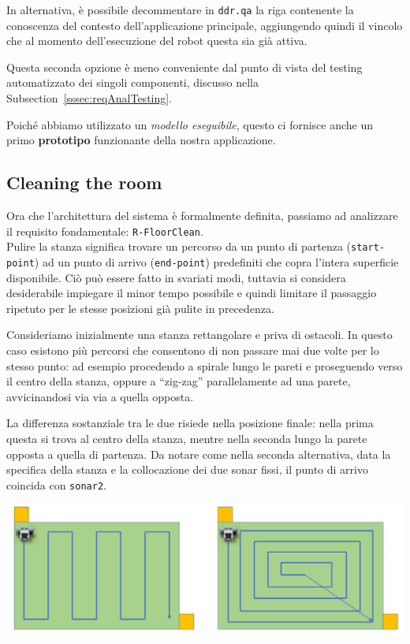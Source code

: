 \documentclass{../llncs}
\newcommand{\codescript}[1]{{\mbox{\small{\texttt{#1}}}}\xspace}
\newcommand{\code}[1]{{\color{blue}\small{\texttt{#1}}}}
\newcommand{\xsss}[1]{\subsectionname~\ref{sssec:#1}}
\newcommand{\subsectionname}{Subsection}
\begin{document}


In alternativa, è possibile decommentare in \codescript{ddr.qa} la riga contenente la conoscenza del contesto dell'applicazione principale, aggiungendo quindi il vincolo che al momento dell'esecuzione del robot questa sia già attiva.

Questa seconda opzione è meno conveniente dal punto di vista del testing automatizzato dei singoli componenti, discusso nella \xsss{reqAnalTesting}.\\

\vspace{8px}

Poiché abbiamo utilizzato un \emph{modello eseguibile}, questo ci fornisce anche un primo \textbf{prototipo} funzionante della nostra applicazione.

\subsection{Cleaning the room}
Ora che l'architettura del sistema è formalmente definita, passiamo ad analizzare il requisito fondamentale: \code{R-FloorClean}.\\

Pulire la stanza significa trovare un percorso da un punto di partenza (\code{start-point}) ad un punto di arrivo (\code{end-point}) predefiniti che copra l'intera superficie disponibile. Ciò può essere fatto in svariati modi, tuttavia si considera desiderabile impiegare il minor tempo possibile e quindi limitare il passaggio ripetuto per le stesse posizioni già pulite in precedenza.

Consideriamo inizialmente una stanza rettangolare e priva di ostacoli. In questo caso esistono più percorsi che consentono di non passare mai due volte per lo stesso punto: ad esempio procedendo a spirale lungo le pareti e proseguendo verso il centro della stanza, oppure a ``zig-zag'' parallelamente ad una parete, avvicinandosi via via a quella opposta.

La differenza sostanziale tra le due risiede nella posizione finale: nella prima questa si trova al centro della stanza, mentre nella seconda lungo la parete opposta a quella di partenza. Da notare come nella seconda alternativa, data la specifica della stanza e la collocazione dei due sonar fissi, il punto di arrivo coincida con \code{sonar2}.\\

\begin{center}
\includegraphics[scale=0.4]{img/roomMap.png}
\end{center}
\end{document}

